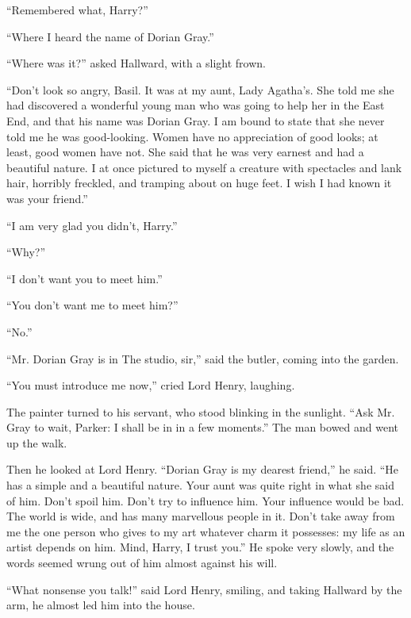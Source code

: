 “Remembered what, Harry?”

“Where I heard the name of Dorian Gray.”

“Where was it?” asked Hallward, with a slight frown.

“Don’t look so angry, Basil. It was at my aunt, Lady Agatha’s. She told me she had discovered a wonderful young man who was going to help her in the East End, and that his name was Dorian Gray. I am bound to state that she never told me he was good-looking. Women have no appreciation of good looks; at least, good women have not. She said that he was very earnest and had a beautiful nature. I at once pictured to myself a creature with spectacles and lank hair, horribly freckled, and tramping about on huge feet. I wish I had known it was your friend.”

“I am very glad you didn’t, Harry.”

“Why?”

“I don’t want you to meet him.”

“You don’t want me to meet him?”

“No.”

“Mr. Dorian Gray is in The studio, sir,” said the butler, coming into the garden.

“You must introduce me now,” cried Lord Henry, laughing.

The painter turned to his servant, who stood blinking in the sunlight. “Ask Mr. Gray to wait, Parker: I shall be in in a few moments.” The man bowed and went up the walk.

Then he looked at Lord Henry. “Dorian Gray is my dearest friend,” he said. “He has a simple and a beautiful nature. Your aunt was quite right in what she said of him. Don’t spoil him. Don’t try to influence him. Your influence would be bad. The world is wide, and has many marvellous people in it. Don’t take away from me the one person who gives to my art whatever charm it possesses: my life as an artist depends on him. Mind, Harry, I trust you.” He spoke very slowly, and the words seemed wrung out of him almost against his will.

“What nonsense you talk!” said Lord Henry, smiling, and taking Hallward by the arm, he almost led him into the house.
